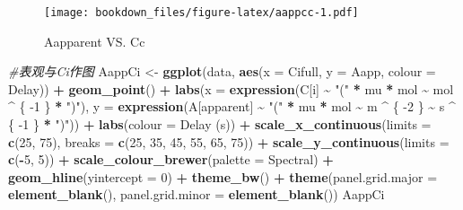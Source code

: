 \documentclass[
]{krantz}
\makeatletter
\newenvironment{Shaded}{\begin{snugshade}}{\end{snugshade}}
\newcommand{\CommentTok}[1]{\textcolor[rgb]{0.56,0.35,0.01}{\textit{#1}}}
\newcommand{\DataTypeTok}[1]{\textcolor[rgb]{0.13,0.29,0.53}{#1}}
\newcommand{\DecValTok}[1]{\textcolor[rgb]{0.00,0.00,0.81}{#1}}
\newcommand{\KeywordTok}[1]{\textcolor[rgb]{0.13,0.29,0.53}{\textbf{#1}}}
\newcommand{\NormalTok}[1]{#1}
\newcommand{\OperatorTok}[1]{\textcolor[rgb]{0.81,0.36,0.00}{\textbf{#1}}}
\newcommand{\StringTok}[1]{\textcolor[rgb]{0.31,0.60,0.02}{#1}}
\newenvironment{kframe}{%
\medskip{}
\setlength{\fboxsep}{.8em}
 \def\at@end@of@kframe{}%
 \ifinner\ifhmode%
  \def\at@end@of@kframe{\end{minipage}}%
  \begin{minipage}{\columnwidth}%
 \fi\fi%
 \def\FrameCommand##1{\hskip\@totalleftmargin \hskip-\fboxsep
 \colorbox{shadecolor}{##1}\hskip-\fboxsep
     \hskip-\linewidth \hskip-\@totalleftmargin \hskip\columnwidth}%
 \MakeFramed {\advance\hsize-\width
   \@totalleftmargin\z@ \linewidth\hsize
   \@setminipage}}%
 {\par\unskip\endMakeFramed%
 \at@end@of@kframe}
\renewenvironment{Shaded}{\begin{kframe}}{\end{kframe}}
\makeatother
\begin{document}
\begin{figure}
\centering
\texttt{[image: bookdown\_files/figure-latex/aappcc-1.pdf]}
\caption{\label{fig:aappcc}Aapparent VS. Cc}
\end{figure}

\begin{Shaded}
\begin{Highlighting}[]
\CommentTok{\#表观与Ci作图}
\NormalTok{AappCi \textless{}{-}}\StringTok{ }\KeywordTok{ggplot}\NormalTok{(data, }\KeywordTok{aes}\NormalTok{(}\DataTypeTok{x =}\NormalTok{ Cifull, }\DataTypeTok{y =}\NormalTok{ Aapp, }\DataTypeTok{colour =}\NormalTok{ Delay)) }\OperatorTok{+}
\StringTok{  }\KeywordTok{geom\_point}\NormalTok{() }\OperatorTok{+}
\StringTok{  }\KeywordTok{labs}\NormalTok{(}\DataTypeTok{x =} \KeywordTok{expression}\NormalTok{(C[i] }\OperatorTok{\textasciitilde{}}\StringTok{ "("} \OperatorTok{*}\StringTok{ }\NormalTok{mu }\OperatorTok{*}\StringTok{ }\NormalTok{mol }\OperatorTok{\textasciitilde{}}\StringTok{ }\NormalTok{mol }\OperatorTok{\^{}}\StringTok{ }\NormalTok{\{}
    \DecValTok{{-}1}
\NormalTok{  \} }\OperatorTok{*}\StringTok{ ")"}\NormalTok{),}
  \DataTypeTok{y =} \KeywordTok{expression}\NormalTok{(A[apparent] }\OperatorTok{\textasciitilde{}}\StringTok{ "("} \OperatorTok{*}\StringTok{ }\NormalTok{mu }\OperatorTok{*}\StringTok{ }\NormalTok{mol }\OperatorTok{\textasciitilde{}}\StringTok{ }\NormalTok{m }\OperatorTok{\^{}}\StringTok{ }\NormalTok{\{}
    \DecValTok{{-}2}
\NormalTok{  \} }\OperatorTok{\textasciitilde{}}\StringTok{ }\NormalTok{s }\OperatorTok{\^{}}\StringTok{ }\NormalTok{\{}
    \DecValTok{{-}1}
\NormalTok{  \} }\OperatorTok{*}\StringTok{ ")"}\NormalTok{)) }\OperatorTok{+}
\StringTok{  }\KeywordTok{labs}\NormalTok{(}\DataTypeTok{colour =} \StringTok{\textquotesingle{}Delay (s)\textquotesingle{}}\NormalTok{) }\OperatorTok{+}
\StringTok{  }\KeywordTok{scale\_x\_continuous}\NormalTok{(}\DataTypeTok{limits =} \KeywordTok{c}\NormalTok{(}\DecValTok{25}\NormalTok{, }\DecValTok{75}\NormalTok{),}
                     \DataTypeTok{breaks =} \KeywordTok{c}\NormalTok{(}\DecValTok{25}\NormalTok{, }\DecValTok{35}\NormalTok{, }\DecValTok{45}\NormalTok{, }\DecValTok{55}\NormalTok{, }\DecValTok{65}\NormalTok{, }\DecValTok{75}\NormalTok{)) }\OperatorTok{+}
\StringTok{  }\KeywordTok{scale\_y\_continuous}\NormalTok{(}\DataTypeTok{limits =} \KeywordTok{c}\NormalTok{(}\OperatorTok{{-}}\DecValTok{5}\NormalTok{, }\DecValTok{5}\NormalTok{)) }\OperatorTok{+}
\StringTok{  }\KeywordTok{scale\_colour\_brewer}\NormalTok{(}\DataTypeTok{palette =} \StringTok{\textquotesingle{}Spectral\textquotesingle{}}\NormalTok{) }\OperatorTok{+}
\StringTok{  }\KeywordTok{geom\_hline}\NormalTok{(}\DataTypeTok{yintercept =} \DecValTok{0}\NormalTok{) }\OperatorTok{+}
\StringTok{  }\KeywordTok{theme\_bw}\NormalTok{() }\OperatorTok{+}
\StringTok{  }\KeywordTok{theme}\NormalTok{(}\DataTypeTok{panel.grid.major =} \KeywordTok{element\_blank}\NormalTok{(),}
        \DataTypeTok{panel.grid.minor =} \KeywordTok{element\_blank}\NormalTok{())}
\NormalTok{AappCi}
\end{Highlighting}
\end{Shaded}
\end{document}
